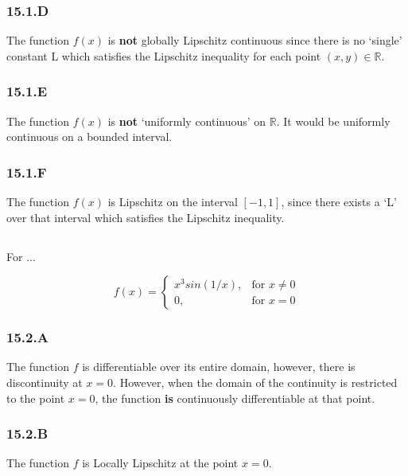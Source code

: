 \documentclass[12px]{article}
\newcommand{\R}{\mathbb{R}}
\begin{document}
\subsubsection*{15.1.D}

The function $f(x)$ is \textbf{not} globally Lipschitz continuous since there is no `single' constant L which satisfies the Lipschitz inequality for each point $(x,y) \in \R$.

\subsubsection*{15.1.E}

The function $f(x)$ is \textbf{not} `uniformly continuous' on $\R$. It would be uniformly continuous on a bounded interval.

\subsubsection*{15.1.F}

The function $f(x)$ is Lipschitz on the interval $[-1, 1]$, since there exists a `L' over that interval which satisfies the Lipschitz inequality.


\subsection{}

For ...

$$
f(x) =
\begin{cases}
    x^{3}sin(1/x), & \text{for $x\neq0 $} \\
    0, & \text{for $x =0$}
\end{cases}
$$


\subsubsection*{15.2.A}

The function $f$ is differentiable over its entire domain, however, there is discontinuity at $x=0$. However, when the domain of the continuity is restricted to the point $x=0$, the function \textbf{is} continuously differentiable at that point.

\subsubsection*{15.2.B}

The function $f$ is Locally Lipschitz at the point $x=0$.
\end{document}
